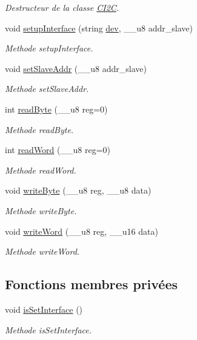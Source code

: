 \begin{DoxyCompactItemize}
\begin{DoxyCompactList}\small\item\em Destructeur de la classe \hyperlink{classCI2C}{C\+I2\+C}. \end{DoxyCompactList}\item 
void \hyperlink{classCI2C_a8fe8755470906582ab854edcbf2a2992}{setup\+Interface} (string \hyperlink{classCI2C_ae2d4648eadc2acae86a49cecbf39ce56}{dev}, \+\_\+\+\_\+u8 addr\+\_\+slave)
\begin{DoxyCompactList}\small\item\em Methode setup\+Interface. \end{DoxyCompactList}\item 
void \hyperlink{classCI2C_ae766fc56ba88f9063e86412fca0c1dfc}{set\+Slave\+Addr} (\+\_\+\+\_\+u8 addr\+\_\+slave)
\begin{DoxyCompactList}\small\item\em Methode set\+Slave\+Addr. \end{DoxyCompactList}\item 
int \hyperlink{classCI2C_afb589b9bdefa75257807b4e6ac2c1c5a}{read\+Byte} (\+\_\+\+\_\+u8 reg=0)
\begin{DoxyCompactList}\small\item\em Methode read\+Byte. \end{DoxyCompactList}\item 
int \hyperlink{classCI2C_a283d5f6d8371e2abb6532b9e32392f9a}{read\+Word} (\+\_\+\+\_\+u8 reg=0)
\begin{DoxyCompactList}\small\item\em Methode read\+Word. \end{DoxyCompactList}\item 
void \hyperlink{classCI2C_a26517fc7e3a282863ff09e7a792f4386}{write\+Byte} (\+\_\+\+\_\+u8 reg, \+\_\+\+\_\+u8 data)
\begin{DoxyCompactList}\small\item\em Methode write\+Byte. \end{DoxyCompactList}\item 
void \hyperlink{classCI2C_a14250174d9281db1bc1db2360cacee40}{write\+Word} (\+\_\+\+\_\+u8 reg, \+\_\+\+\_\+u16 data)
\begin{DoxyCompactList}\small\item\em Methode write\+Word. \end{DoxyCompactList}\end{DoxyCompactItemize}
\subsection*{Fonctions membres privées}
\begin{DoxyCompactItemize}
\item 
void \hyperlink{classCI2C_a821adb4a309a1377fef4d1b8487a731e}{is\+Set\+Interface} ()
\begin{DoxyCompactList}\small\item\em Methode is\+Set\+Interface. \end{DoxyCompactList}\end{DoxyCompactItemize}
